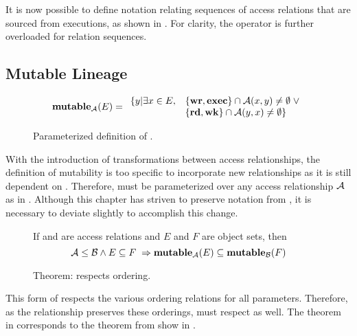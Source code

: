 It is now possible to define notation relating sequences of access relations that are sourced from executions, as shown in .
For clarity, the \rightsleq{} operator is further overloaded for \maximal{} relation sequences.

\subsection{Mutable Lineage}

\begin{figure}
  \[ \mathbf{mutable}_{\mathcal{A}}(E) =
  \begin{array}{ll}
    \{y | \exists x \in E, & \{\mathbf{wr}, \mathbf{exec}\} \cap \mathcal{A}(x,y) \neq \emptyset \; \lor \\ 
    & \{\mathbf{rd}, \mathbf{wk}\} \cap \mathcal{A}(y,x) \neq \emptyset\}
  \end{array}
  \]
\caption{Parameterized definition of \mutable{}.\label{SW:def:newMutable}}
\end{figure}

With the introduction of transformations between access relationships, the definition of mutability is too specific to incorporate new relationships as it is still dependent on \potacc{}.
Therefore, \mutable{} must be parameterized over any access relationship \(\mathcal{A}\) as in .
Although this chapter has striven to preserve notation from \TMSW{}, it is necessary to deviate slightly to accomplish this change.

\begin{figure}
If  and  are access relations and \(E\) and \(F\) are object sets, then
\[ \mathcal{A} \leq \mathcal{B} \land E \subseteq F \; \Rightarrow \mathbf{mutable}_{\mathcal{A}}(E) \subseteq \mathbf{mutable}_{\mathcal{B}}(F) \]
\caption{Theorem: \mutable{} respects ordering. \label{SW:thm:mutableRespectful}}
\end{figure} 

This form of \mutable{} respects the various ordering relations for all parameters.
Therefore, as the \ProjPotAcc{} relationship preserves these orderings, \mutable{} must respect \ProjPotAcc{} as well.
The theorem in  corresponds to the \COQproperMutableSpec{} theorem from \TMmodelName{} show in .

